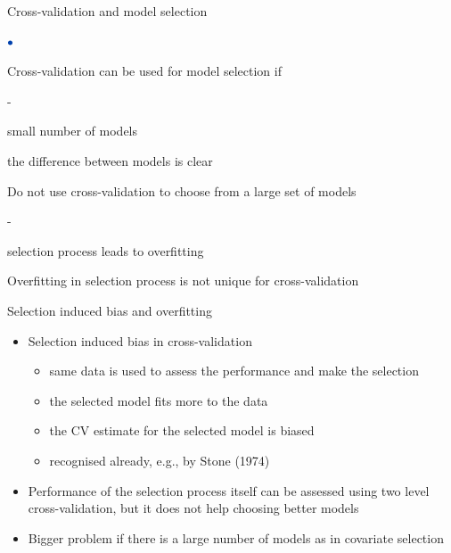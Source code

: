 \documentclass[english,t]{beamer}
\newenvironment{list1}{
   \begin{list}{$\color{list1}\bullet$}{\itemsep=6pt}}{
  \end{list}}
\newenvironment{list2}{
  \begin{list}{-}{\baselineskip=12pt\itemsep=2pt}}{
  \end{list}}
\begin{document}
\begin{frame}{}

  {\Large\color{navyblue}  Cross-validation and model selection}

  \begin{list1}
  \item<1-> Cross-validation can be used for model selection if
    \begin{list2}
      \item small number of models
      \item the difference between models is clear
    \end{list2}
  \item<2-> Do not use cross-validation to choose from a large set of models
    \begin{list2}
    \item selection process leads to overfitting
    \end{list2}
  \item<3-> Overfitting in selection process is not unique for cross-validation
  \end{list1}
\end{frame}

\begin{frame}
  
  {\Large\color{navyblue} Selection induced bias and overfitting}

  \begin{itemize}
  \item Selection induced bias in cross-validation
    \begin{itemize}
    \item same data is used to assess the performance and make the selection
    \item the selected model fits more to the data
    \item the CV estimate for the selected model is biased
    \item recognised already, e.g., by Stone (1974)
    \end{itemize}
    \pause
  \item Performance of the selection process itself can be assessed
    using two level cross-validation, but it does not help choosing
    better models
    \pause
  \item Bigger problem if there is a large number of models as in
    covariate selection
  \end{itemize}

\end{frame}
\end{document}
